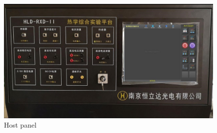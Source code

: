 \documentclass[UTF8]{article}
\begin{document}
		\begin{figure}[H]
			\centering
			\includegraphics[clip,scale=0.9,trim={0 50 0 30}]{fig/fig3.jpg}
			\caption{Host panel}
			\label{figure.1}
		\end{figure}
\end{document}
